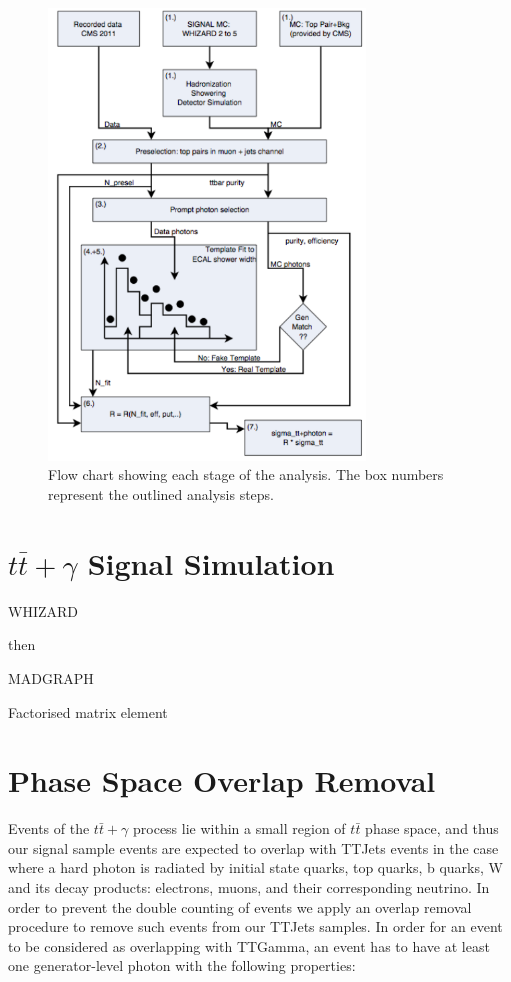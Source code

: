 \begin{figure}
\begin{center}
\includegraphics[width=0.75\textwidth]{Figures/AnalysisFlowChart.png}
\end{center}
\caption{Flow chart showing each stage of the analysis. The box numbers represent the outlined
analysis steps.}
\label{fig-AnalysisFlowChart}
\end{figure}

\section{$t\bar{t}+\gamma$ Signal Simulation}

WHIZARD

then

MADGRAPH

Factorised matrix element 

\section{Phase Space Overlap Removal} \label{sec-PhaseSpaceOverlapRemoval}

Events of the $t\bar{t}+\gamma$ process lie within a small region of $t\bar{t}$ phase space, and thus our signal sample events are expected to overlap with TTJets events in the case where a hard photon is radiated by initial state quarks, top quarks, b quarks, W and its decay products: electrons, muons, and their corresponding neutrino. In order to prevent the double counting of events we apply an overlap removal procedure to remove such events from our TTJets samples. In order for an event to be considered as overlapping with TTGamma, an event has to have at least one generator-level photon with the following properties:


